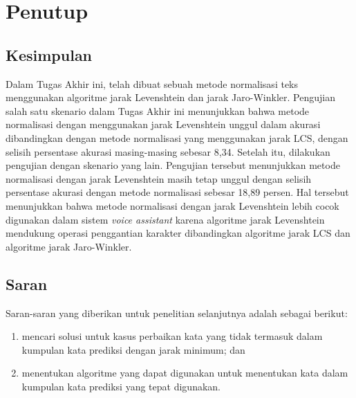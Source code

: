 \chapter{Penutup}

\section{Kesimpulan}

Dalam Tugas Akhir ini, telah dibuat sebuah metode normalisasi teks menggunakan algoritme jarak Levenshtein dan jarak Jaro-Winkler. Pengujian salah satu skenario dalam Tugas Akhir ini menunjukkan bahwa metode normalisasi dengan menggunakan jarak Levenshtein unggul dalam akurasi dibandingkan dengan metode normalisasi \parencite{saragih2017normalisasi} yang menggunakan jarak LCS, dengan selisih persentase akurasi masing-masing sebesar 8,34. Setelah itu, dilakukan pengujian dengan skenario yang lain. Pengujian tersebut menunjukkan metode normalisasi dengan jarak Levenshtein masih tetap unggul dengan selisih persentase akurasi dengan metode normalisasi \parencite{saragih2017normalisasi} sebesar 18,89 persen. Hal tersebut menunjukkan bahwa metode normalisasi dengan jarak Levenshtein lebih cocok digunakan dalam sistem \textit{voice assistant} karena algoritme jarak Levenshtein mendukung operasi penggantian karakter dibandingkan algoritme jarak LCS dan algoritme jarak Jaro-Winkler.

\section{Saran}

Saran-saran yang diberikan untuk penelitian selanjutnya adalah sebagai berikut:
\begin{enumerate}
    \item mencari solusi untuk kasus perbaikan kata yang tidak termasuk dalam kumpulan kata prediksi dengan jarak minimum; dan
    \item menentukan algoritme yang dapat digunakan untuk menentukan kata dalam kumpulan kata prediksi yang tepat digunakan.
\end{enumerate}